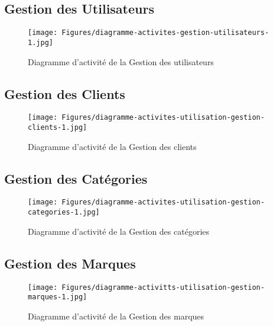 \vspace{.5cm}
\subsection{Gestion des Utilisateurs}
\vspace{.5cm}

\begin{figure}[H]
    \centering
    \texttt{[image: Figures/diagramme-activites-gestion-utilisateurs-1.jpg]}
    \caption{Diagramme d'activité de la Gestion des utilisateurs}
\end{figure}


\vspace{.5cm}
\subsection{Gestion des Clients}
\vspace{.5cm}

\begin{figure}[H]
    \centering
    \texttt{[image: Figures/diagramme-activites-utilisation-gestion-clients-1.jpg]}
    \caption{Diagramme d'activité de la Gestion des clients}
\end{figure}

\vspace{.5cm}
\subsection{Gestion des Catégories}
\vspace{.5cm}

\begin{figure}[H]
    \centering
    \texttt{[image: Figures/diagramme-activites-utilisation-gestion-categories-1.jpg]}
    \caption{Diagramme d'activité de la Gestion des catégories}
\end{figure}


\vspace{.5cm}
\subsection{Gestion des Marques}
\vspace{.5cm}

\begin{figure}[H]
    \centering
    \texttt{[image: Figures/diagramme-activitts-utilisation-gestion-marques-1.jpg]}
    \caption{Diagramme d'activité de la Gestion des marques}
\end{figure}


